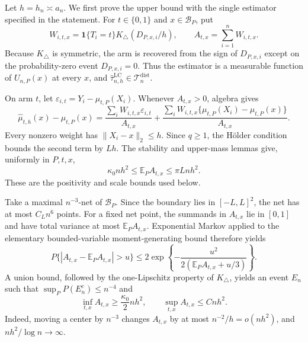 Let \(h=h_n\asymp a_n\).  We first prove the upper bound with the single estimator specified in the statement.  For \(t\in\{0,1\}\) and \(x\in\mathcal B_P\), put
\[
 W_{i,t,x}=\mathbf 1\{T_i=t\}K_\triangle(D_{P,x,i}/h),
 \qquad A_{t,x}=\sum_{i=1}^nW_{i,t,x}.
\]
Because \(K_\triangle\) is symmetric, the arm is recovered from the sign of \(D_{P,x,i}\) except on the probability-zero event \(D_{P,x,i}=0\).  Thus the estimator is a measurable function of \(U_{n,P}(x)\) at every \(x\), and \(\widehat\tau^{\mathrm{LC}}_{n,h}\in\mathcal T_n^{\mathrm{dist}}\).

On arm \(t\), let \(\varepsilon_{i,t}=Y_i-\mu_{t,P}(X_i)\).  Whenever \(A_{t,x}>0\), algebra gives
\[
 \widehat\mu_{t,h}(x)-\mu_{t,P}(x)
 =\frac{\sum_iW_{i,t,x}\varepsilon_{i,t}}{A_{t,x}}
 +\frac{\sum_iW_{i,t,x}\{\mu_{t,P}(X_i)-\mu_{t,P}(x)\}}{A_{t,x}}.
\]
Every nonzero weight has \(\lVert X_i-x\rVert_2\leq h\).  Since \(q\geq1\), the H\"older condition bounds the second term by \(Lh\).  The stability and upper-mass lemmas give, uniformly in \(P,t,x\),
\[
 \kappa_0nh^2\leq\mathbb E_PA_{t,x}\leq\pi Lnh^2.
\]
These are the positivity and scale bounds used below.

Take a maximal \(n^{-3}\)-net of \(\mathcal B_P\).  Since the boundary lies in \([-L,L]^2\), the net has at most \(C_Ln^6\) points.  For a fixed net point, the summands in \(A_{t,x}\) lie in \([0,1]\) and have total variance at most \(\mathbb E_PA_{t,x}\).  Exponential Markov applied to the elementary bounded-variable moment-generating bound therefore yields
\[
 P\{|A_{t,x}-\mathbb E_PA_{t,x}|>u\}
 \leq2\exp\!\left\{-\frac{u^2}{2(\mathbb E_PA_{t,x}+u/3)}\right\}.
\]
A union bound, followed by the one-Lipschitz property of \(K_\triangle\), yields an event \(E_n\) such that \(\sup_PP(E_n^c)\leq n^{-4}\) and
\[
 \inf_{t,x}A_{t,x}\geq\frac{\kappa_0}{2}nh^2,
 \qquad \sup_{t,x}A_{t,x}\leq Cnh^2.
\]
Indeed, moving a center by \(n^{-3}\) changes \(A_{t,x}\) by at most \(n^{-2}/h=o(nh^2)\), and \(nh^2/\log n\to\infty\).

